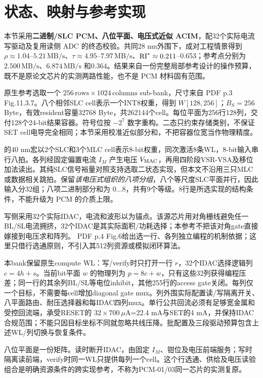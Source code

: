 \section{状态、映射与参考实现}

本节采用\textbf{二进制/SLC PCM、八位平面、电压式近似 ACIM}，配32个实际电流写驱动及复用读侧 ADC 的终态校验。共同28 nm外围下，成对工程情景得到 $\rho\approx1.04$--$5.21\,\mathrm{MB/s}$、$\tau\approx4.95$--$7.97\,\mathrm{MB/s}$、$\mathrm{RI}^*\approx0.211$--0.653；参考点分别为 $2.500\,\mathrm{MB/s}$、$6.874\,\mathrm{MB/s}$ 和0.364。结果来自一份完整局部参考设计的操作预算，既不是原论文芯片的实测两路性能，也不是 PCM 材料固有范围。

原生参考选取一个 $256\,\text{rows}\times1024\,\text{columns}$ sub-bank，尺寸来自 PDF p.3 Fig.11.3.7。八个相邻SLC cell表示一个INT8权重，得到 $W[128,256]$；$B_S=256$ Byte，有效resident容量32768 Byte，共262144个cell。每位平面为256行128列，交付128个24-bit结果容器。符号位按 $-2^7$ 数字重构。二态只约束存储类别，不保证SET cell电导完全相同；本节采用校准近似部分和，不把容器位宽当作物理精度。

 的40 nm宏以2个SLC和3个MLC cell表示8-bit权重，同次激活8条WL，8-bit输入串行八拍。各列经固定偏置电流 $I_M$ 产生电压 $V_{\rm MAC}$，再用四阶段VSR-VSA及移位加法读出。其纯SLC信号裕量对照支持选取二状态实现，但本文不沿用三只MLC或数据相关跳拍。保留\emph{该电压式组织的八项分组}，八个等尺度SLC平面并行，因此输入分32组；八项二进制部分和为 $0\ldots8$，共有9个等级。8行是所选实现的结构条件，不能升级为 PCM 的介质上限。

写侧采用32个实际IDAC，电流和波形以为锚点。该源芯片用对角栅线避免任一BL/SL电流拥挤，32个IDAC是其实际面积/功耗选择；本参考不把该对角gate直接嫁接到电压求和阵列。 PDF p.4 Fig.6给出选一行、各列独立编程的机制依据；这里只借行选通原则，不引入其512列资源或模拟闭环算法。

本bank保留原生compute WL：写/verify时只打开一行 $r$，32个IDAC选择逻辑列 $c=4h+s$。当前bit平面 $w$ 的物理列为 $p=8c+w$，只有这些32列获得编程压差；同一行的其余列BL/SL等电位inhibit，其他255行的access gate关闭。每列仅一个目标，不需要每cell增加diagonal gate mux。列外围实际配置读/写隔离开关、八平面路由、耐压选择器和每IDAC四列mux。单行公共回流必须有足够宽金属和受控回流端，承受RESET的 $32\times700\ \mu$A=22.4 mA与SET的4 mA，并保持IDAC合规范围；不能只因目标坐标不同就忽略共线压降。批配置及三段驱动预算包含上述WL/列切换与恢复条件。

八位平面是一份矩阵。读时断开IDAC，由固定 $I_M$、钳位及电压前端服务；写时隔离读前端，verify时同一WL只提供每列一个cell。这个行选通、供给及电压读验组合是明确资源条件的跨实现参考，不称为PCM-01/03同一芯片的实测复原。

